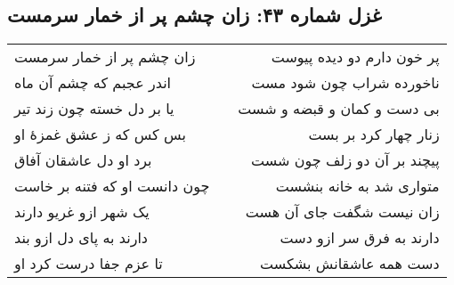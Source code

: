 \begin{center}
\section*{غزل شماره ۴۳: زان چشم پر از خمار سرمست}
\label{sec:043}
\begin{longtable}{l p{0.5cm} r}
زان چشم پر از خمار سرمست
&&
پر خون دارم دو دیده پیوست
\\
اندر عجبم که چشم آن ماه
&&
ناخورده شراب چون شود مست
\\
یا بر دل خسته چون زند تیر
&&
بی دست و کمان و قبضه و شست
\\
بس کس که ز عشق غمزهٔ او
&&
زنار چهار کرد بر بست
\\
برد او دل عاشقان آفاق
&&
پیچند بر آن دو زلف چون شست
\\
چون دانست او که فتنه بر خاست
&&
متواری شد به خانه بنشست
\\
یک شهر ازو غریو دارند
&&
زان نیست شگفت جای آن هست
\\
دارند به پای دل ازو بند
&&
دارند به فرق سر ازو دست
\\
تا عزم جفا درست کرد او
&&
دست همه عاشقانش بشکست
\\
\end{longtable}
\end{center}
